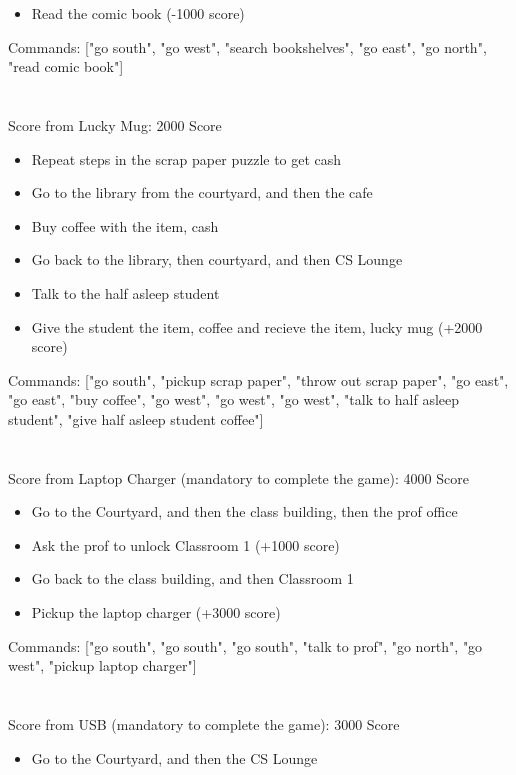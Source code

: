 \documentclass[11pt]{article}
\begin{document}
\begin{enumerate}
\begin{itemize}
            \item Read the comic book (-1000 score)
        \end{itemize}
Commands: ["go south", "go west",  "search bookshelves", "go east", "go north", "read comic book"]
\\\\\\
Score from Lucky Mug: 2000 Score
        \begin{itemize}
            \item Repeat steps in the scrap paper puzzle to get cash
            \item Go to the library from the courtyard, and then the cafe
            \item Buy coffee with the item, cash
            \item Go back to the library, then courtyard, and then CS Lounge
            \item Talk to the half asleep student
            \item Give the student the item, coffee and recieve the item, lucky mug (+2000 score)
        \end{itemize}
Commands: ["go south", "pickup scrap paper", "throw out scrap paper", "go east", "go east", "buy coffee", "go west", "go west", "go west", "talk to half asleep student", "give half asleep student coffee"]
\\\\\\
Score from Laptop Charger (mandatory to complete the game): 4000 Score
        \begin{itemize}
            \item Go to the Courtyard, and then the class building, then the prof office
            \item Ask the prof to unlock Classroom 1 (+1000 score)
            \item Go back to the class building, and then Classroom 1
            \item Pickup the laptop charger (+3000 score)
        \end{itemize}
Commands: ["go south", "go south",  "go south", "talk to prof", "go north", "go west", "pickup laptop charger"]
\\\\\\
Score from USB (mandatory to complete the game): 3000 Score
        \begin{itemize}
            \item Go to the Courtyard, and then the CS Lounge

\end{itemize}
\end{enumerate}
\end{document}
